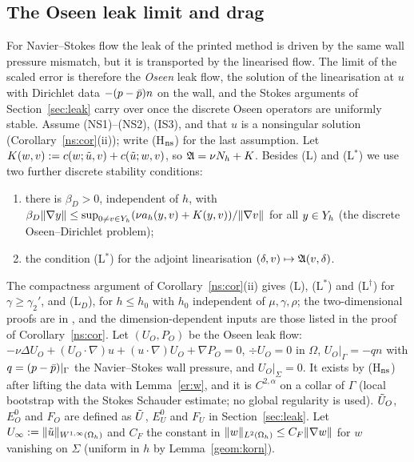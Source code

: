 \subsection{The Oseen leak limit and drag}\label{ns:sec:oseen}
For Navier--Stokes flow the leak of the printed method is driven by the same wall pressure mismatch, but it is transported by the linearised flow. The limit of the scaled error is therefore the \emph{Oseen} leak flow, the solution of the linearisation at $u$ with Dirichlet data $-(p-\bar p)n$ on the wall, and the Stokes arguments of Section~\ref{sec:leak} carry over once the discrete Oseen operators are uniformly stable.
Assume (NS1)--(NS2), (IS3), and that $u$ is a nonsingular solution (Corollary~\ref{ns:cor}(ii)); write (H$_{\rm ns}$) for the last assumption. Let $K(w,v):=c(w;\tilde u,v)+c(\tilde u;w,v)$, so $\mathfrak A=\nu N_h+K$. Besides (L) and (L$^\ast$) we use two further discrete stability conditions:
\begin{enumerate}
\item[(L$_D$)] there is $\beta_D>0$, independent of $h$, with $\beta_D\lVert \nabla y\rVert\le\sup_{0\ne v\in Y_h}(\nu a_h(y,v)+K(y,v))/\lVert \nabla v\rVert$ for all $y\in Y_h$ (the discrete Oseen--Dirichlet problem);
\item[(L$^\dagger$)] the condition (L$^\ast$) for the adjoint linearisation $(\delta,v)\mapsto\mathfrak A(v,\delta)$.
\end{enumerate}
The compactness argument of Corollary~\ref{ns:cor}(ii) gives (L), (L$^\ast$) and (L$^\dagger$) for $\gamma\ge\gamma_2'$, and (L$_D$), for $h\le h_0$ with $h_0$ independent of $\mu,\gamma,\rho$; the two-dimensional proofs are in \cite{PadhiLong2D}, and the dimension-dependent inputs are those listed in the proof of Corollary~\ref{ns:cor}.
Let $(U_O,P_O)$ be the Oseen leak flow: $-\nu\Delta U_O+(U_O\cdot\nabla)u+(u\cdot\nabla)U_O+\nabla P_O=0$, $\div U_O=0$ in $\Omega$, $U_O|_\Gamma=-qn$ with $q=(p-\bar p)|_\Gamma$ the Navier--Stokes wall pressure, and $U_O|_\Sigma=0$. It exists by (H$_{\rm ns}$) after lifting the data with Lemma~\ref{er:w}, and it is $C^{2,\alpha}$ on a collar of $\Gamma$ (local bootstrap with the Stokes Schauder estimate; no global regularity is used). $\tilde U_O$, $E^0_O$ and $F_O$ are defined as $\tilde U$, $E^0_U$ and $F_U$ in Section~\ref{sec:leak}. Let $U_\infty:=\lVert \tilde u\rVert_{W^{1,\infty}(\Omega_h)}$ and $C_F$ the constant in $\lVert w\rVert_{L^2(\Omega_h)}\le C_F\lVert \nabla w\rVert$ for $w$ vanishing on $\Sigma$ (uniform in $h$ by Lemma~\ref{geom:korn}).


